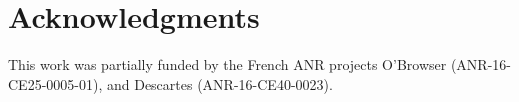 
\section*{Acknowledgments}

This work was partially
funded by
the French ANR projects O'Browser (\mbox{ANR-16-CE25-0005-01}), and Descartes
(\mbox{ANR-16-CE40-0023}).


